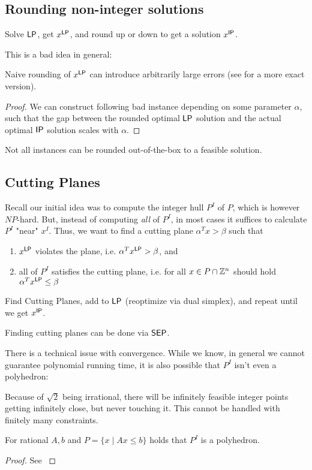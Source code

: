 \subsection{Rounding non-integer solutions}
\begin{idea}
    Solve $\mathsf{LP}$, get $x^{\mathsf{LP}}$, and round up or down to get a solution $x^{\mathsf{IP}}$.
\end{idea}
This is a bad idea in general:
\begin{theorem}
    Naive rounding of $x^{\mathsf{LP}}$ can introduce arbitrarily large errors
    (see \cite[Thm.~5.7]{comb-optimization-korte} for a more exact version).
\end{theorem}
\begin{proof}
    We can construct following bad instance depending on some parameter $\alpha$,
    such that the gap between the rounded optimal $\mathsf{LP}$ solution and the actual optimal $\mathsf{IP}$ solution scales with $\alpha$.
\end{proof}
\begin{remark}
    Not all instances can be rounded out-of-the-box to a feasible solution.
\end{remark}

\subsection{Cutting Planes}
Recall our initial idea was to compute the integer hull $P^I$ of $P$, which is however $NP$-hard.
But, instead of computing \emph{all} of $P^I$, in most cases it suffices to calculate $P^I$ "near" $x^I$.
Thus, we want to find a cutting plane $\alpha^Tx > \beta$ such that
\begin{enumerate}
    \item $x^{\mathsf{LP}}$ violates the plane, i.e. $\alpha^T x^{\mathsf{LP}} > \beta$, and
    \item all of $P^I$ satisfies the cutting plane,
          i.e. for all $x \in P \cap \mathbb{Z}^n$ should hold $\alpha^T x^{\mathsf{LP}} \leq \beta$
\end{enumerate}
\begin{idea}
    Find Cutting Planes, add to $\mathsf{LP}$ (reoptimize via dual simplex), and repeat until we get $x^{\mathsf{IP}}$.
\end{idea}
Finding cutting planes can be done via $\mathsf{SEP}$.
\begin{remark}
    There is a technical issue with convergence. While we know, in general we cannot guarantee polynomial running time,
    it is also possible that $P^I$ isn't even a polyhedron:

    Because of $\sqrt{2}$ being irrational, there will be infinitely feasible integer points
    getting infinitely close, but never touching it. This cannot be handled with finitely many constraints.
\end{remark}
\begin{theorem} \label{thm:fundamental_mip}
    For rational $A,b$ and $P=\{x \mid Ax \leq b\}$ holds that $P^I$ is a polyhedron.
\end{theorem}
\begin{proof}
    See \cite[Thm.~5.1]{comb-optimization-korte}
\end{proof}